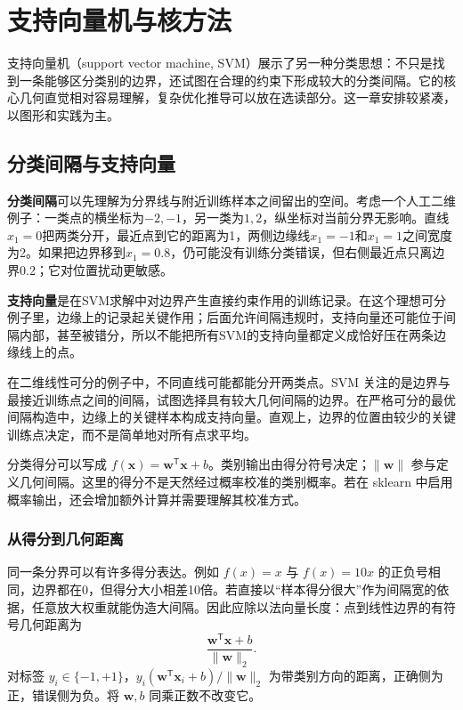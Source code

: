 \chapter{支持向量机与核方法}

支持向量机（support vector machine, SVM）展示了另一种分类思想：不只是找到一条能够区分类别的边界，还试图在合理的约束下形成较大的分类间隔。它的核心几何直觉相对容易理解，复杂优化推导可以放在选读部分。这一章安排较紧凑，以图形和实践为主。
\section{分类间隔与支持向量}

\textbf{分类间隔}可以先理解为分界线与附近训练样本之间留出的空间。考虑一个人工二维例子：一类点的横坐标为$-2,-1$，另一类为$1,2$，纵坐标对当前分界无影响。直线$x_1=0$把两类分开，最近点到它的距离为1，两侧边缘线$x_1=-1$和$x_1=1$之间宽度为2。如果把边界移到$x_1=0.8$，仍可能没有训练分类错误，但右侧最近点只离边界0.2；它对位置扰动更敏感。

\textbf{支持向量}是在SVM求解中对边界产生直接约束作用的训练记录。在这个理想可分例子里，边缘上的记录起关键作用；后面允许间隔违规时，支持向量还可能位于间隔内部，甚至被错分，所以不能把所有SVM的支持向量都定义成恰好压在两条边缘线上的点。

在二维线性可分的例子中，不同直线可能都能分开两类点。SVM 关注的是边界与最接近训练点之间的间隔，试图选择具有较大几何间隔的边界。在严格可分的最优间隔构造中，边缘上的关键样本构成支持向量。直观上，边界的位置由较少的关键训练点决定，而不是简单地对所有点求平均。

分类得分可以写成 $f(\mathbf x)=\mathbf w^\mathsf T\mathbf x+b$。类别输出由得分符号决定；$\|\mathbf w\|$ 参与定义几何间隔。这里的得分不是天然经过概率校准的类别概率。若在 sklearn 中启用概率输出，还会增加额外计算并需要理解其校准方式。


\subsection{从得分到几何距离}
同一条分界可以有许多得分表达。例如 $f(x)=x$ 与 $f(x)=10x$ 的正负号相同，边界都在0，但得分大小相差10倍。若直接以“样本得分很大”作为间隔宽的依据，任意放大权重就能伪造大间隔。因此应除以法向量长度：点到线性边界的有符号几何距离为
\[
\frac{\mathbf w^\mathsf T\mathbf x+b}{\|\mathbf w\|_2}.
\]
对标签 $y_i\in\{-1,+1\}$，$y_i(\mathbf w^\mathsf T\mathbf x_i+b)/\|\mathbf w\|_2$ 为带类别方向的距离，正确侧为正，错误侧为负。将 $\mathbf w,b$ 同乘正数不改变它。

